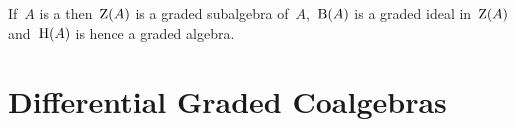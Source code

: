 \documentclass[a4paper,10pt,headings=standardclasses]{scrartcl}
\begin{document}

\begin{proposition}
  If~$A$ is a {\dga} then~$\operatorname{Z}(A)$ is a graded subalgebra of~$A$,~$\operatorname{B}(A)$  is a graded ideal in~$\operatorname{Z}(A)$ and~$\operatorname{H}(A)$ is hence a graded algebra.
\end{proposition}




\section{Differential Graded Coalgebras}
\end{document}
